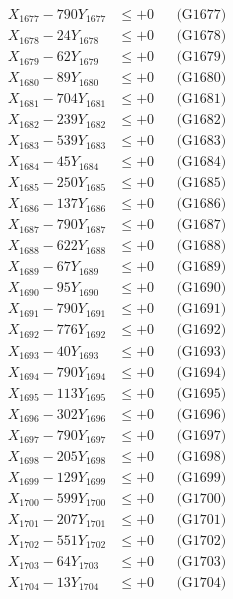 \documentclass[a4paper,10pt]{article}
\begin{document}
{\begin{align}
X_{1677} - 790Y_{1677} &\leq +0 && \text{(G1677)} \\
X_{1678} - 24Y_{1678} &\leq +0 && \text{(G1678)} \\
X_{1679} - 62Y_{1679} &\leq +0 && \text{(G1679)} \\
X_{1680} - 89Y_{1680} &\leq +0 && \text{(G1680)} \\
\allowbreak
X_{1681} - 704Y_{1681} &\leq +0 && \text{(G1681)} \\
X_{1682} - 239Y_{1682} &\leq +0 && \text{(G1682)} \\
X_{1683} - 539Y_{1683} &\leq +0 && \text{(G1683)} \\
X_{1684} - 45Y_{1684} &\leq +0 && \text{(G1684)} \\
X_{1685} - 250Y_{1685} &\leq +0 && \text{(G1685)} \\
X_{1686} - 137Y_{1686} &\leq +0 && \text{(G1686)} \\
X_{1687} - 790Y_{1687} &\leq +0 && \text{(G1687)} \\
X_{1688} - 622Y_{1688} &\leq +0 && \text{(G1688)} \\
X_{1689} - 67Y_{1689} &\leq +0 && \text{(G1689)} \\
X_{1690} - 95Y_{1690} &\leq +0 && \text{(G1690)} \\
\allowbreak
X_{1691} - 790Y_{1691} &\leq +0 && \text{(G1691)} \\
X_{1692} - 776Y_{1692} &\leq +0 && \text{(G1692)} \\
X_{1693} - 40Y_{1693} &\leq +0 && \text{(G1693)} \\
X_{1694} - 790Y_{1694} &\leq +0 && \text{(G1694)} \\
X_{1695} - 113Y_{1695} &\leq +0 && \text{(G1695)} \\
X_{1696} - 302Y_{1696} &\leq +0 && \text{(G1696)} \\
X_{1697} - 790Y_{1697} &\leq +0 && \text{(G1697)} \\
X_{1698} - 205Y_{1698} &\leq +0 && \text{(G1698)} \\
X_{1699} - 129Y_{1699} &\leq +0 && \text{(G1699)} \\
X_{1700} - 599Y_{1700} &\leq +0 && \text{(G1700)} \\
\allowbreak
X_{1701} - 207Y_{1701} &\leq +0 && \text{(G1701)} \\
X_{1702} - 551Y_{1702} &\leq +0 && \text{(G1702)} \\
X_{1703} - 64Y_{1703} &\leq +0 && \text{(G1703)} \\
X_{1704} - 13Y_{1704} &\leq +0 && \text{(G1704)} \\

\end{align}}
\end{document}
